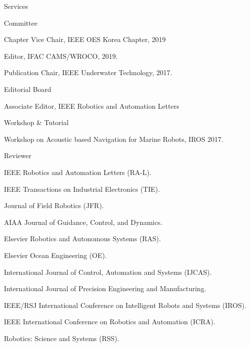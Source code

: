 \begin{rSection}{Services}

\begin{rSubsection}{Committee}{}{}{}
  \item Chapter Vice Chair, IEEE OES Korea Chapter, 2019
  \item Editor, IFAC CAMS/WROCO, 2019.
  \item Publication Chair, IEEE Underwater Technology, 2017.
\end{rSubsection}

\begin{rSubsection}{Editorial Board}{}{}{}
  \item Associate Editor, IEEE Robotics and Automation Letters
\end{rSubsection}

\begin{rSubsection}{Workshop \& Tutorial}{}{}{}
  \item Workshop on Acoustic based Navigation for Marine Robots, IROS 2017.
\end{rSubsection}

\begin{rSubsection}{Reviewer}{}{}{}
  \item IEEE Robotics and Automation Letters (RA-L).
  \item IEEE Transactions on Industrial Electronics (TIE).
  \item Journal of Field Robotics (JFR).
  \item AIAA Journal of Guidance, Control, and Dynamics.
  \item Elsevier Robotics and Autonomous Systems (RAS).
  \item Elsevier Ocean Engineering (OE).
  \item International Journal of Control, Automation and Systems (IJCAS).
  \item International Journal of Precision Engineering and Manufacturing.
  \item IEEE/RSJ International Conference on Intelligent Robots and Systems (IROS).
  \item IEEE International Conference on Robotics and Automation (ICRA).
  \item Robotics: Science and Systems (RSS).
\end{rSubsection}


\end{rSection}

